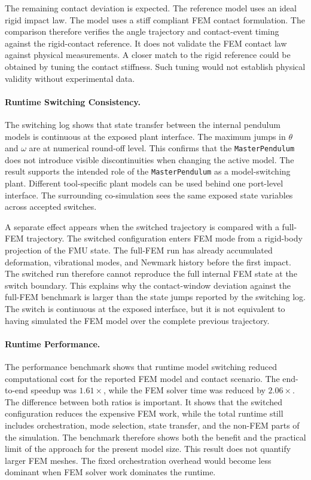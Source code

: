 The remaining contact deviation is expected.
The reference model uses an ideal rigid impact law.
The \syssimx{} model uses a stiff compliant \ac{FEM} contact formulation.
The comparison therefore verifies the angle trajectory and contact-event timing against the rigid-contact reference.
It does not validate the \ac{FEM} contact law against physical measurements.
A closer match to the rigid reference could be obtained by tuning the contact stiffness.
Such tuning would not establish physical validity without experimental data.

\paragraph{Runtime Switching Consistency.}
The switching log shows that state transfer between the internal pendulum models is continuous at the exposed plant interface.
The maximum jumps in \(\theta\) and \(\omega\) are at numerical round-off level.
This confirms that the \texttt{MasterPendulum} does not introduce visible discontinuities when changing the active model.
The result supports the intended role of the \texttt{MasterPendulum} as a model-switching plant.
Different tool-specific plant models can be used behind one port-level interface.
The surrounding co-simulation sees the same exposed state variables across accepted switches.

A separate effect appears when the switched trajectory is compared with a full-\ac{FEM} trajectory.
The switched configuration enters \ac{FEM} mode from a rigid-body projection of the \ac{FMU} state.
The full-\ac{FEM} run has already accumulated deformation, vibrational modes, and Newmark history before the first impact.
The switched run therefore cannot reproduce the full internal \ac{FEM} state at the switch boundary.
This explains why the contact-window deviation against the full-\ac{FEM} benchmark is larger than the state jumps reported by the switching log.
The switch is continuous at the exposed interface, but it is not equivalent to having simulated the \ac{FEM} model over the complete previous trajectory.

\paragraph{Runtime Performance.}
The performance benchmark shows that runtime model switching reduced computational cost for the reported \ac{FEM} model and contact scenario.
The end-to-end speedup was \(1.61\times\), while the \ac{FEM} solver time was reduced by \(2.06\times\).
The difference between both ratios is important.
It shows that the switched configuration reduces the expensive \ac{FEM} work, while the total runtime still includes orchestration, mode selection, state transfer, and the non-\ac{FEM} parts of the simulation.
The benchmark therefore shows both the benefit and the practical limit of the approach for the present model size.
This result does not quantify larger \ac{FEM} meshes.
The fixed orchestration overhead would become less dominant when \ac{FEM} solver work dominates the runtime.

